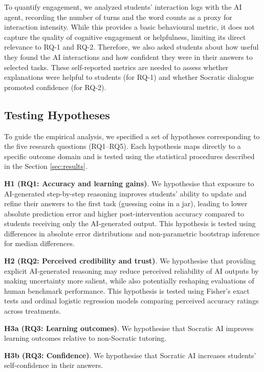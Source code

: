\documentclass[
  11pt,
]{article}
\begin{document}
To quantify engagement, we analyzed students' interaction logs with the AI agent, recording the number of turns and the word counts as a proxy for interaction intensity. While this provides a basic behavioural metric, it does not capture the quality of cognitive engagement or helpfulness, limiting its direct relevance to RQ-1 and RQ-2. Therefore, we also asked students about how useful they found the AI interactions and how confident they were in their answers to selected tasks. These self-reported metrics are needed to assess whether explanations were helpful to students (for RQ-1) and whether Socratic dialogue promoted confidence (for RQ-2).

\subsection{Testing Hypotheses}\label{testing-hypotheses}

To guide the empirical analysis, we specified a set of hypotheses corresponding to the five research questions (RQ1--RQ5). Each hypothesis maps directly to a specific outcome domain and is tested using the statistical procedures described in the Section \ref{sec:results}.

\textbf{H1 (RQ1: Accuracy and learning gains)}.
We hypothesise that exposure to AI-generated step-by-step reasoning improves students' ability to update and refine their answers to the first task (guessing coins in a jar), leading to lower absolute prediction error and higher post-intervention accuracy compared to students receiving only the AI-generated output. This hypothesis is tested using differences in absolute error distributions and non-parametric bootstrap inference for median differences.

\textbf{H2 (RQ2: Perceived credibility and trust)}.
We hypothesise that providing explicit AI-generated reasoning may reduce perceived reliability of AI outputs by making uncertainty more salient, while also potentially reshaping evaluations of human benchmark performance. This hypothesis is tested using Fisher's exact tests and ordinal logistic regression models comparing perceived accuracy ratings across treatments.

\textbf{H3a (RQ3: Learning outcomes)}.
We hypothesise that Socratic AI improves learning outcomes relative to non-Socratic tutoring.

\textbf{H3b (RQ3: Confidence)}.
We hypothesise that Socratic AI increases students' self-confidence in their answers.
\end{document}
